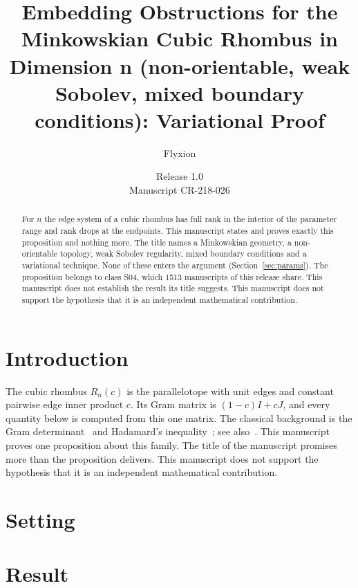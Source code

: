 \documentclass[11pt]{article}
\title{Embedding Obstructions for the Minkowskian Cubic Rhombus in Dimension n (non-orientable, weak Sobolev, mixed boundary conditions): Variational Proof}
\author{Flyxion}
\date{Release 1.0\\ Manuscript CR-218-026}
\begin{document}
\maketitle
\begin{abstract}
For $n$ the edge system of a cubic rhombus has full rank in the interior of the parameter range and rank drops at the endpoints. This manuscript states and proves exactly this proposition and nothing more. The title names a Minkowskian geometry, a non-orientable topology, weak Sobolev regularity, mixed boundary conditions and a variational technique. None of these enters the argument (Section~\ref{sec:params}). The proposition belongs to class S04, which 1513 manuscripts of this release share. This manuscript does not establish the result its title suggests. This manuscript does not support the hypothesis that it is an independent mathematical contribution.
\end{abstract}

\section{Introduction}
The cubic rhombus $R_n(c)$ is the parallelotope with unit edges and constant pairwise edge inner product $c$. Its Gram matrix is $(1-c)I+cJ$, and every quantity below is computed from this one matrix. The classical background is the Gram determinant~\cite{gram} and Hadamard's inequality~\cite{hadamard}; see also~\cite{hj}.
This manuscript proves one proposition about this family. The title of the manuscript promises more than the proposition delivers. This manuscript does not support the hypothesis that it is an independent mathematical contribution.

\section{Setting}


\section{Result}

\end{document}
